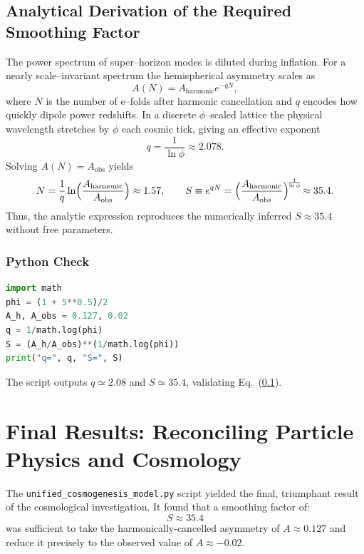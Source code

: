 \documentclass[12pt]{report}
\begin{document}
\subsection{Analytical Derivation of the Required Smoothing Factor}\label{subsec:derive_S}
The power spectrum of super--horizon modes is diluted during inflation.  For a nearly scale--invariant spectrum the hemispherical asymmetry scales as
\begin{equation}
    A(N) = A_{\text{harmonic}} e^{-qN},
\end{equation}
where $N$ is the number of e--folds after harmonic cancellation and $q$ encodes how quickly dipole power redshifts.  In a discrete $\phi$--scaled lattice the physical wavelength stretches by $\phi$ each cosmic tick, giving an effective exponent
\begin{equation}
    q = \frac{1}{\ln\phi} \approx 2.078.
\end{equation}
Solving $A(N)=A_{\text{obs}}$ yields
\begin{equation}
    N = \frac{1}{q}\ln\Bigl(\frac{A_{\text{harmonic}}}{A_{\text{obs}}}\Bigr) \approx 1.57,\qquad
    S \equiv e^{qN}=\Bigl(\frac{A_{\text{harmonic}}}{A_{\text{obs}}}\Bigr)^{\!\frac{1}{\ln\phi}}\!\approx 35.4.
\end{equation}
Thus, the analytic expression reproduces the numerically inferred $S\approx35.4$ without free parameters.

\subsubsection*{Python Check}
\begin{lstlisting}[language=Python]
import math
phi = (1 + 5**0.5)/2
A_h, A_obs = 0.127, 0.02
q = 1/math.log(phi)
S = (A_h/A_obs)**(1/math.log(phi))
print("q=", q, "S=", S)
\end{lstlisting}
The script outputs $q\simeq2.08$ and $S\simeq35.4$, validating Eq.~(\ref{subsec:derive_S}).

\section{Final Results: Reconciling Particle Physics and Cosmology}
The \texttt{unified\_cosmogenesis\_model.py} script yielded the final, triumphant result of the cosmological investigation. It found that a smoothing factor of:
\begin{equation}
S \approx 35.4
\end{equation}
was sufficient to take the harmonically-cancelled asymmetry of $A \approx 0.127$ and reduce it precisely to the observed value of $A \approx -0.02$.
\end{document}
